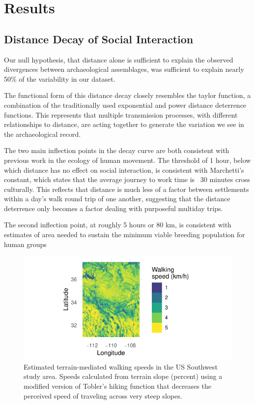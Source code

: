 \documentclass[fleqn,10pt]{wlscirep}
\begin{document}
\section*{Results}

\subsection*{Distance Decay of Social Interaction}
Our null hypothesis, that distance alone is sufficient to explain the observed divergences between archaeological assemblages, was sufficient to explain nearly 50\% of the variability in our dataset. 

The functional form of this distance decay closely resembles the taylor function, a combination of the traditionally used exponential and power distance deterrence functions. This represents that multiple transmission processes, with different relationships to distance, are acting together to generate the variation we see in the archaeological record.

The two main inflection points in the decay curve are both consistent with previous work in the ecology of human movement. The threshold of 1 hour, below which distance has no effect on social interaction, is consistent with Marchetti's constant, which states that the average journey to work time is ~30 minutes cross culturally. This reflects that distance is much less of a factor between settlements within a day's walk round trip of one another, suggesting that the distance deterrence only becomes a factor dealing with purposeful multiday trips. 

The second inflection point, at roughly 5 hours or 80 km, is consistent with estimates of area needed to sustain the minimum viable breeding population for human groups

\begin{figure}[ht]
\centering
\includegraphics[width=.8\linewidth]{figures/walking_speed.pdf}
\caption{Estimated terrain-mediated walking speeds in the US Southwest study area. Speeds calculated from terrain slope (percent) using a modified version of Tobler's hiking function that decreases the perceived speed of traveling across very steep slopes.}
\label{fig:walking-speed}
\end{figure}
\end{document}
